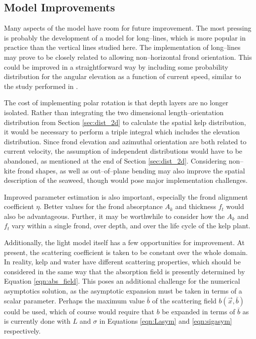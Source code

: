 \subsection{Model Improvements}
Many aspects of the model have room for future improvement.
The most pressing is probably the development of a model for long--lines, which
is more popular in practice than the vertical lines studied here.
The implementation of long--lines may prove to be closely related to allowing non--horizontal frond orientation.
This could be improved in a straightforward way by including some
probability distribution for the angular elevation as a function of current speed,
similar to the study performed in \citep{norvik_design_2017}.

The cost of implementing polar rotation is that depth layers are no longer isolated.
Rather than integrating the two dimensional length--orientation distribution from
Section \ref{sec:dist_2d} to calculate the spatial kelp distribution,
it would be necessary to perform a triple integral which includes the elevation distribution.
Since frond elevation and azimuthal orientation are both related to current velocity,
the assumption of independent distributions would have to be abandoned, as mentioned at the end of Section \ref{sec:dist_2d}.
Considering non--kite frond shapes, as well as out--of--plane bending may also improve the spatial description of the seaweed, though would pose major implementation challenges.

Improved parameter estimation is also important, especially the frond alignment coefficient $\eta$.
Better values for the frond absorptance $A_k$ and thickness $f_t$ would also be advantageous.
Further, it may be worthwhile to consider how the $A_k$ and $f_t$ vary within a single frond, over depth, and over the life cycle of the kelp plant.

Additionally, the light model itself has a few opportunities for improvement.
At present, the scattering coefficient is taken to be constant over the whole domain.
In reality, kelp and water have different scattering properties, which should be considered in the same way that the absorption field is presently determined by Equation \eqref{eqn:abs_field}.
This poses an additional challenge for the numerical asymptotics solution, as the asymptotic expansion must be taken in terms of a scalar parameter.
Perhaps the maximum value $\bar{b}$ of the scattering field $b(\vec{x}, \bar{b})$ could be used, which of course would require that $b$ be expanded in terms of $\bar{b}$ as is currently done with $L$ and $\sigma$ in Equations \eqref{eqn:Lasym} and \eqref{eqn:sigasym} respectively.

